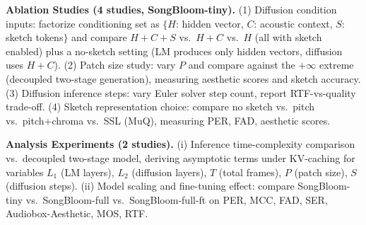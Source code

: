 \begin{tcolorbox}
\smallskip
\textbf{Ablation Studies (4 studies, SongBloom-tiny).} (1) Diffusion condition inputs: factorize conditioning set as $\{H$: hidden vector, $C$: acoustic context, $S$: sketch tokens$\}$ and compare $H+C+S$ vs.\ $H+C$ vs.\ $H$ (all with sketch enabled) plus a no-sketch setting (LM produces only hidden vectors, diffusion uses $H+C$). (2) Patch size study: vary $P$ and compare against the $+\infty$ extreme (decoupled two-stage generation), measuring aesthetic scores and sketch accuracy. (3) Diffusion inference steps: vary Euler solver step count, report RTF-vs-quality trade-off. (4) Sketch representation choice: compare no sketch vs.\ pitch vs.\ pitch+chroma vs.\ SSL (MuQ), measuring PER, FAD, aesthetic scores.

\smallskip
\textbf{Analysis Experiments (2 studies).} (i) Inference time-complexity comparison vs.\ decoupled two-stage model, deriving asymptotic terms under KV-caching for variables $L_1$ (LM layers), $L_2$ (diffusion layers), $T$ (total frames), $P$ (patch size), $S$ (diffusion steps). (ii) Model scaling and fine-tuning effect: compare SongBloom-tiny vs.\ SongBloom-full vs.\ SongBloom-full-ft on PER, MCC, FAD, SER, Audiobox-Aesthetic, MOS, RTF.
\end{tcolorbox}

